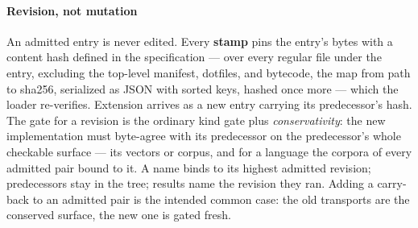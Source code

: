 \paragraph{Revision, not mutation}
An admitted entry is never edited. Every \textbf{stamp} pins the
entry's bytes with a content hash defined in the specification ---
over every regular file under the entry, excluding the top-level
manifest, dotfiles, and bytecode, the map from path to sha256,
serialized as JSON with sorted keys, hashed once more --- which the
loader re-verifies. Extension arrives as a new entry
 carrying its predecessor's hash. The gate for a
revision is the ordinary kind gate plus \emph{conservativity}: the
new implementation must byte-agree with its predecessor on the
predecessor's whole checkable surface --- its vectors or corpus, and
for a language the corpora of every admitted pair bound to it. A name
binds to its highest admitted revision; predecessors stay in the
tree; results name the revision they ran. Adding a carry-back to an
admitted pair is the intended common case: the old transports are the
conserved surface, the new one is gated fresh.

